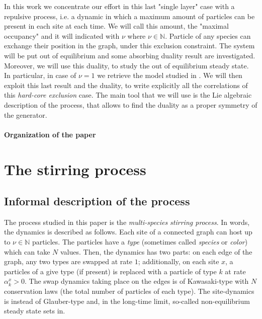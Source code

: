 \documentclass[11pt]{article}
\numberwithin{equation}{section}
\numberwithin{equation}{subsection}
\newcommand{\twoj}{\nu}
\begin{document}
In this work we concentrate our effort in this last "single layer" case with a repulsive process, i.e. a dynamic in which a maximum amount of particles can be present in each site at each time. We will call this amount, the "maximal occupancy" and it will indicated with $\twoj$ where $\twoj\in\mathbb{N}$. Particle of any species can exchange their position in the graph, under this exclusion constraint. The system will be put out of equilibrium and some absorbing duality result are investigated. Moreover, we will use this duality, to study the out of equilibrium steady state. In particular, in case of $\twoj=1$ we retrieve the model studied in \cite{vanicat2017exact}. We will then exploit this last result and the duality, to write explicitly all the correlations of this \textit{hard-core exclusion} case. The main tool that we will use is the Lie algebraic description of the process, that allows to find the duality as a proper symmetry of the generator. 
\paragraph{Organization of the paper}
\section{The stirring process}
\subsection{Informal description of the process}
The process studied in this paper is the {\em multi-species stirring process}. 
In words, the dynamics is described as follows. Each site
of a connected graph can host up to $\nu\in \mathbb{N}$ particles.
The particles have a {\em type} (sometimes called {\em species} or {\em color})
which can take $N$ values.
Then, the dynamics has two parts: on each edge of the graph, 
any two types are swapped at rate $1$; additionally, on each site $x$, 
a particles of a give type (if present) is replaced with a
particle of type $k$ at rate $\alpha_k^x >0$.
The swap dynamics taking place on the edges is of Kawasaki-type 
with $N$ conservation laws
(the total number of particles of each type). 
The site-dynamics is instead of Glauber-type 
and, in the long-time limit, so-called non-equilibrium
steady state sets in.
\end{document}
